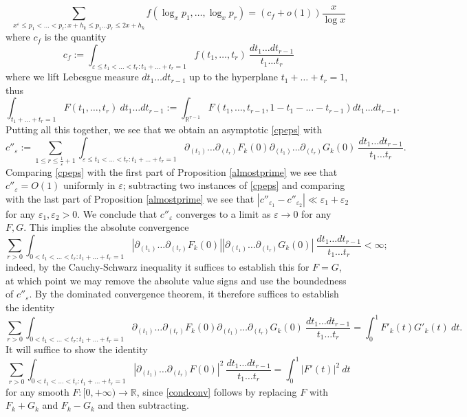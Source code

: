 \documentclass{bmcart}
\theoremstyle{plain}
\theoremstyle{definition}
\newcommand\R{\mathbb{R}}
\newcommand\eps{\varepsilon}
\begin{document}
$$ \sum_{x^\eps \leq p_1 < \dots < p_r: x+h_k \leq p_1 \dots p_r \leq 2x+h_k} f(\log_x p_1,\dots, \log_x p_r) = (c_f + o(1)) \frac{x}{\log x} $$
where $c_f$ is the quantity
$$ c_f := \int_{\eps \leq t_1 < \dots < t_r: t_1 + \dots + t_r = 1} f( t_1,\dots,t_r)\ \frac{dt_1 \dots dt_{r-1}}{t_1 \dots t_r}$$
where we lift Lebesgue measure $dt_1 \dots dt_{r-1}$ up to the hyperplane $t_1+\dots+t_r=1$, thus
$$ \int_{t_1+\dots+t_r=1} F(t_1,\dots,t_r)\ dt_1 \dots dt_{r-1} := \int_{\R^{r-1}} F(t_1,\dots,t_{r-1},1-t_1-\dots-t_{r-1}) dt_1 \dots dt_{r-1}.$$
Putting all this together, we see that we obtain an asymptotic \eqref{cpeps} with
$$ c''_\eps := \sum_{1 \leq r \leq \frac{1}{\eps}+1} 
\int_{\eps \leq t_1 < \dots < t_r: t_1 + \dots + t_r = 1} \partial_{(t_1)} \dots \partial_{(t_r)} F_k(0)
\partial_{(t_1)} \dots \partial_{(t_r)} G_k(0)\ \frac{dt_1 \dots dt_{r-1}}{t_1 \dots t_r}.$$
Comparing \eqref{cpeps} with the first part of Proposition \ref{almostprime} we see that $c''_\eps = O(1)$ uniformly in $\eps$; subtracting two instances of \eqref{cpeps} and comparing with the last part of Proposition \ref{almostprime} we see that $|c''_{\eps_1} - c''_{\eps_2}| \ll \eps_1 + \eps_2$ for any $\eps_1,\eps_2 > 0$.  We conclude that $c''_\eps$ converges to a limit as $\eps\rightarrow 0$ for any $F,G$.  This implies the absolute convergence
\begin{equation}\label{absconv}
 \sum_{r>0} \int_{0 < t_1 < \dots < t_r: t_1 + \dots + t_r = 1} |\partial_{(t_1)} \dots \partial_{(t_r)} F_k(0)|
|\partial_{(t_1)} \dots \partial_{(t_r)} G_k(0)|\ \frac{dt_1 \dots dt_{r-1}}{t_1 \dots t_r} < \infty;
\end{equation}
indeed, by the Cauchy-Schwarz inequality it suffices to establish this for $F=G$, at which point we may remove the absolute value signs and use the boundedness of $c''_\eps$.  By the dominated convergence theorem, it therefore suffices to establish the identity
\begin{equation}\label{condconv}
 \sum_{r>0} \int_{0 < t_1 < \dots < t_r: t_1 + \dots + t_r = 1} \partial_{(t_1)} \dots \partial_{(t_r)} F_k(0)
\partial_{(t_1)} \dots \partial_{(t_r)} G_k(0)\ \frac{dt_1 \dots dt_{r-1}}{t_1 \dots t_r} = \int_0^1 F'_k(t) G'_k(t)\ dt.
\end{equation}
It will suffice to show the identity
\begin{equation}\label{depol}
 \sum_{r>0} \int_{0 < t_1 < \dots < t_r: t_1 + \dots + t_r = 1} |\partial_{(t_1)} \dots \partial_{(t_r)} F(0)|^2\ \frac{dt_1 \dots dt_{r-1}}{t_1 \dots t_r} = \int_0^1 |F'(t)|^2\ dt
\end{equation}
for any smooth $F: [0,+\infty) \to \R$, since \eqref{condconv} follows by replacing $F$ with $F_k+G_k$ and $F_k-G_k$ and then subtracting.
\end{document}
